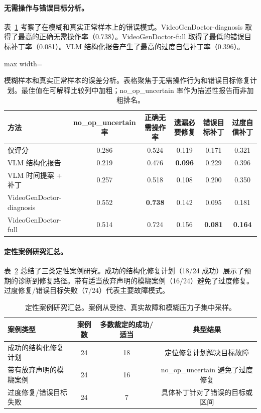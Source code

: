 \documentclass{article}
\begin{document}
\begin{table}[t]
\centering\scriptsize
\caption{模糊样本和真实正常样本的误差分析。表格聚焦于无需操作行为和错误目标修复计划。最佳值在可解释比较列中加粗；no\_op\_uncertain 率作为描述性报告而非加粗排名。}
\paragraph{无需操作与错误目标分析。}
表~\ref{tab:no_op_wrong_target_analysis} 考察了在模糊和真实正常样本上的错误模式。VideoGenDoctor-diagnosis 取得了最高的正确无需操作率（0.738）。VideoGenDoctor-full 取得了最低的错误目标补丁率（0.081）。VLM 结构化报告产生了最高的过度自信补丁率（0.396）。

\label{tab:no_op_wrong_target_analysis}
\begin{adjustbox}{max width=\textwidth}
\begin{tabular}{lccccc}
\toprule
方法 & no\_op\_uncertain 率 & 正确无需操作率 & 遗漏必要修复 & 错误目标补丁 & 过度自信补丁 \\
\midrule
仅评分 & 0.286 & 0.524 & 0.119 & 0.171 & 0.321 \\
VLM 结构化报告 & 0.219 & 0.476 & \textbf{0.096} & 0.229 & 0.396 \\
VLM 时间提案 + 补丁 & 0.257 & 0.518 & 0.108 & 0.200 & 0.350 \\
VideoGenDoctor-diagnosis & 0.552 & \textbf{0.738} & 0.142 & 0.095 & 0.181 \\
VideoGenDoctor-full & 0.514 & 0.724 & 0.156 & \textbf{0.081} & \textbf{0.164} \\
\bottomrule
\end{tabular}
\end{adjustbox}
\end{table}

\begin{table}[t]
\centering\scriptsize
\caption{定性案例研究汇总。案例从受控、真实故障和模糊压力子集中采样。}
\paragraph{定性案例研究汇总。}
表~\ref{tab:case_study_summary} 总结了三类定性案例研究。成功的结构化修复计划（18/24 成功）展示了预期的诊断到修复路径。带有适当放弃声明的模糊案例（16/24）避免了过度修复。过度修复/错误目标失败（7/24）代表主要故障模式。

\label{tab:case_study_summary}
\begin{tabular}{lccc}
\toprule
案例类型 & 案例数 & 多数裁定的成功/适当 & 典型结果 \\
\midrule
成功的结构化修复计划 & 24 & 18 & 定位修复计划解决目标故障 \\
带有放弃声明的模糊案例 & 24 & 16 & no\_op\_uncertain 避免了过度修复 \\
过度修复/错误目标失败 & 24 & 7 & 具体补丁针对了错误的目标或区间 \\
\bottomrule
\end{tabular}
\end{table}
\end{document}
